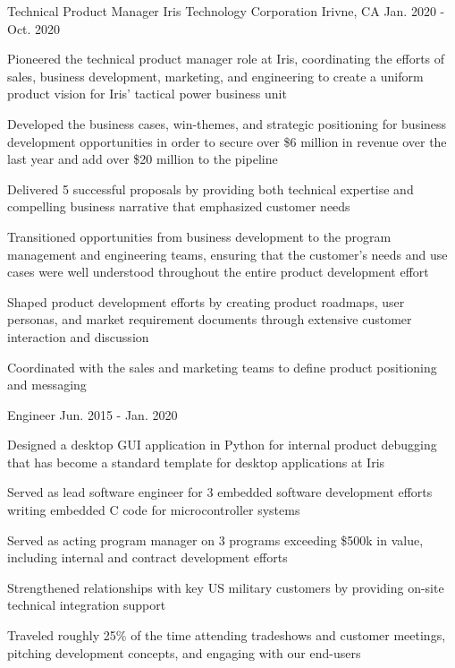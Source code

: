 \begin{cventries}
  \cventry
    {Technical Product Manager} %
    {Iris Technology Corporation} %
    {Irivne, CA} %
    {Jan. 2020 - Oct. 2020} %
    {
      \begin{cvitems} %
        \item {Pioneered the technical product manager role at Iris, coordinating the efforts of sales, business development, marketing, and engineering to create a uniform product vision for Iris' tactical power business unit}
        \item {Developed the business cases, win-themes, and strategic positioning for business development opportunities in order to secure over \$6 million in revenue over the last year and add over \$20 million to the pipeline}
        \item {Delivered 5 successful proposals by providing both technical expertise and compelling business narrative that emphasized customer needs}
        \item {Transitioned opportunities from business development to the program management and engineering teams, ensuring that the customer's needs and use cases were well understood throughout the entire product development effort}
        \item {Shaped product development efforts by creating product roadmaps, user personas, and market requirement documents through extensive customer interaction and discussion}
        \item {Coordinated with the sales and marketing teams to define product positioning and messaging}
      \end{cvitems}
    }

    \cventry
    {Engineer} %
    {} %
    {}
    {Jun. 2015 - Jan. 2020} %
    {
      \begin{cvitems} %
        \item {Designed a desktop GUI application in Python for internal product debugging that has become a standard template for desktop applications at Iris}
        \item {Served as lead software engineer for 3 embedded software development efforts writing embedded C code for microcontroller systems}
        \item {Served as acting program manager on 3 programs exceeding \$500k in value, including internal and contract development efforts}
        \item {Strengthened relationships with key US military customers by providing on-site technical integration support}
        \item {Traveled roughly 25\% of the time attending tradeshows and customer meetings, pitching development concepts, and engaging with our end-users}
      \end{cvitems}
    }

\end{cventries}
